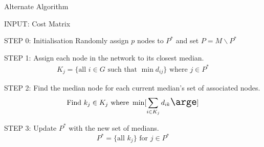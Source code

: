 \documentclass[11pt]{article}
\begin{document}
\begin{algorithm}
	\caption{Alternate Algorithm}
	\begin{algorithmic}[0]
		\Statex 
		\Statex INPUT: Cost Matrix
		
		\Statex 
		\Statex STEP 0: Initialisation
		\Statex Randomly assign $p$ nodes to $P^*$ and set $P = M \backslash P^*$
		
		\Statex 
		\Statex STEP 1: Assign each node in the network to its closest median.
		\begin{align*}
		K_j=\{\text{all } i \in G \text{ such that } \min d_{ij}\} \text{ where } j \in P^*
		\end{align*}
		
		\Statex 
		\Statex STEP 2: Find the median node for each current median's set of associated nodes.
		\begin{equation*}
		\text{Find } k_j \in K_j \text{ where } \min \Large[ \sum_{i\in K_j} d_{ik} \arge] 
		\end{equation*}

		
		\Statex 
		\Statex STEP 3: Update $P^*$ with the new set of medians.
		\begin{equation*}
		P^{*} = \{\text{all } k_j  \} \text{ for } j \in P^*
		\end{equation*}
		
		
	\end{algorithmic}
\end{algorithm}
		
		
\end{document}

